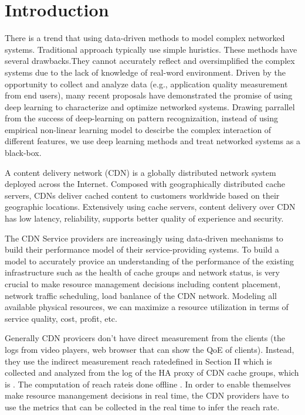 \documentclass[5p]{elsarticle}
\newcommand{\dabiaolv}{reach rate}
\begin{document}
\section{Introduction}
There is a trend \cite{Jiang2017Pytheas:Exploration-Exploitation} \cite{Mao2017NeuralPensieve} that using data-driven methods to model complex networked systems. Traditional approach typically use simple huristics. These methods have several drawbacks.They cannot accurately reflect and oversimplified the complex systems due to the lack of knowledge of real-word environment. Driven by the opportunity to collect and analyze data (e.g., application quality measurement from end users), many recent proposals have demonstrated the promise of using deep learning to characterize and optimize networked systems. Drawing parrallel from the success of deep-learning on pattern recognizaition, instead of using empirical non-linear learning model to descirbe the complex interaction of different features, we use deep learning methods and treat networked systems as a black-box.

A content delivery network (CDN) is a globally distributed network system deployed across the Internet. Composed with geographically distributed cache servers, CDNs deliver cached content  to  customers  worldwide  based  on their geographic locations. Extensively  using  cache  servers,  content  delivery over  CDN  has  low  latency, reliability, supports better quality of experience and security.

The CDN Service providers are increasingly using data-driven mechanisms to build their performance model of their service-providing systems. To build a model to accurately provice an understanding of the performance of the existing infrastructure such as the health of cache groups and network status, is very crucial to make resource management decisions including content placement, network traffic scheduling, load banlance of the CDN network. Modeling all available physical resources, we can maximize a resource utilization in terms of service quality, cost, profit, etc.

Generally CDN provicers don't have direct measurement from the clients (the logs from video players, web browser that can show the QoE of clients). Instead, they use the indirect measurement \dabiaolv defined in Section II which is collected and analyzed from the log of the HA proxy of CDN cache groups, which is . The computation of \dabiaolv is done offline . In order to enable themselves make resource manangement decisions in real time, the CDN providers have to use the metrics that can be collected in the real time to infer the \dabiaolv. 
\end{document}
